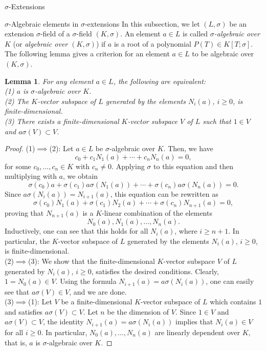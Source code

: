 \documentclass[11pt,a4paper]{article}
\theoremstyle{theorem}
\newtheorem{lemma}[theorem]{Lemma}
\numberwithin{equation}{section}
\newcommand{\s}{\sigma}
\begin{document}
\begin{section}{$\s$-Extensions}
\begin{subsection}{$\s$-Algebraic elements in $\s$-extensions } 	
	In this subsection, we let $(L,\sigma)$ be an extension $\sigma$-field  of a $\sigma$-field $(K,\sigma)$. An element $a\in L$ is called \textit{$\s$-algebraic over $K$} (or \textit{algebraic over $(K,\sigma)$}) if  $a$ is a root of a polynomial $P(T)\in K[T;\sigma]$. The following lemma gives a criterion for an element $a\in L$ to be algebraic over $(K,\sigma)$.
	\begin{lemma}\label{(L)Criterionalgebraic}
		For any element $a\in L$, the following are equivalent:\\
		(1) $a$ is $\s$-algebraic over $K$.\\
		(2) The $K$-vector subspace of $L$ generated by the elements $N_i(a)$, $i\geq 0$, is finite-dimensional. \\
		(3) There exists a finite-dimensional $K$-vector subspace $V$ of $L$ such that $1\in V$ and $a\s(V)\subset V$.   
	\end{lemma}
	\begin{proof}
		(1)$\implies$(2): Let $a\in L$ be $\s$-algebraic over $K$. Then, we have
		$$c_0+c_1N_1(a)+\cdots+c_{n}N_{n}(a)=0,$$
		for some $c_0,...,c_n\in K$ with $c_n\neq 0$. Applying $\s$ to this equation and then multiplying  with $a$, we obtain
		$$\sigma(c_0)a+\sigma(c_1)a\s(N_1(a))+\cdots+\s(c_{n})a\s(N_{n}(a))=0.$$
		Since $a\s(N_i(a))=N_{i+1}(a)$, this equation can be rewritten as
		$$\sigma(c_0)N_1(a)+\sigma(c_1)N_2(a)+\cdots+\s(c_{n})N_{n+1}(a)=0,$$
		proving that $N_{n+1}(a)$ is a $K$-linear combination of the elements
		$$N_0(a),N_1(a),\dots,N_{n}(a).$$
		Inductively, one can see that this holds for all $N_i(a)$, where $i\geq n+1$. In particular, the $K$-vector subspace of $L$ generated by the elements $N_i(a)$, $i\geq 0$, is finite-dimensional.\\
		(2)$\implies$(3): We show that the finite-dimensional $K$-vector subspace $V$ of $L$ generated by $N_i(a)$, $i\geq 0$, satisfies the desired conditions. Clearly, $1=N_0(a)\in V$. Using the formula $N_{i+1}(a)=a\s(N_i(a))$, one can easily see that  $a\s(V)\in V$, and we are done.\\
		(3)$\implies$(1): Let  $V$ be a finite-dimensional $K$-vector subspace  of $L$ which contains $1$ and satisfies $a\s(V)\subset V$. Let $n$ be the dimension of $V$. Since $1\in V$ and  $a\s(V)\subset V$, the identity $N_{i+1}(a)=a\s(N_i(a))$ implies that  $N_i(a)\in V$ for all $i\geq 0$. In particular, $N_0(a),...,N_{n}(a)$ are linearly dependent over $K$, that is,  $a$ is $\s$-algebraic over $K$. 

\end{proof}
\end{subsection}
\end{section}
\end{document}
